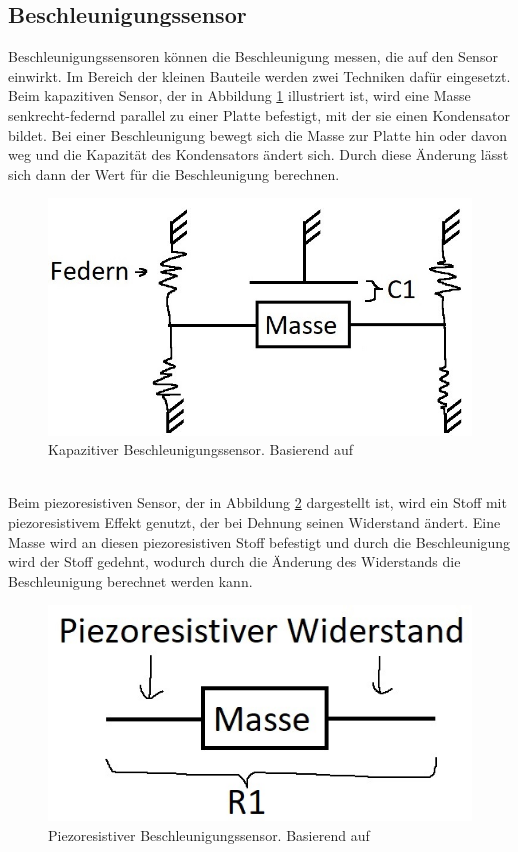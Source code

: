 \subsection{Beschleunigungssensor}
Beschleunigungssensoren können die Beschleunigung messen, die auf den Sensor einwirkt.
Im Bereich der kleinen Bauteile werden zwei Techniken dafür eingesetzt.\\
Beim kapazitiven Sensor, der in Abbildung \ref{fig:pic_accel_kapa} illustriert ist, wird eine Masse senkrecht-federnd parallel zu einer Platte befestigt, mit der sie einen Kondensator bildet.
Bei einer Beschleunigung bewegt sich die Masse zur Platte hin oder davon weg und die Kapazität des Kondensators ändert sich.
Durch diese Änderung lässt sich dann der Wert für die Beschleunigung berechnen. \cite{site_mems}
\begin{figure}[h]
	\centering
	\includegraphics[width=0.33\linewidth]{res/kinAccel.jpg}
	\caption{Kapazitiver Beschleunigungssensor. Basierend auf \cite{site_sensorbild}}
	\label{fig:pic_accel_kapa}
\end{figure}\\
Beim piezoresistiven Sensor, der in Abbildung \ref{fig:pic_accel_pie} dargestellt ist, wird ein Stoff mit piezoresistivem Effekt genutzt, der bei Dehnung seinen Widerstand ändert.
Eine Masse wird an diesen piezoresistiven Stoff befestigt und durch die Beschleunigung wird der Stoff gedehnt, wodurch durch die Änderung des Widerstands die Beschleunigung berechnet werden kann. \cite{site_dms}
\begin{figure}[h]
	\centering
	\includegraphics[width=0.25\linewidth]{res/prAccel.jpg}
	\caption{Piezoresistiver Beschleunigungssensor. Basierend auf \cite{site_sensorbild}}
	\label{fig:pic_accel_pie}
\end{figure}\\

